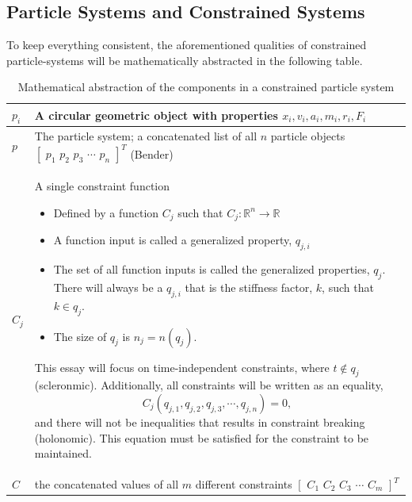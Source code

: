 \documentclass[12pt, letterpaper]{article}
\begin{document}
\subsection{Particle Systems and Constrained Systems}
\hspace{\parindent} To keep everything consistent, the aforementioned qualities of constrained particle-systems will be mathematically abstracted in the following table.
\def\arraystretch{2}%
\begin{table}[H]
\begin{tabular}{ | m{3em} | m{13.5cm}| }
  \hline
  $p_i$ & A circular geometric object with properties $x_{i}, v_{i}, a_{i}, m_{i}, r_{i}, F_{i}$ \\ 
  \hline
  $p$ & The particle system; a concatenated list of all $n$ particle objects $[\hspace{4pt}p_{1} \hspace{4pt} p_{2} \hspace{4pt} p_{3} \hspace{4pt} \cdots \hspace{4pt} p_{n}\hspace{4pt}] ^ {T}$ (Bender) \\ 
  \hline
  $C_j$ & A single constraint function
 \begin{itemize}
  \item Defined by a function $C_j$ such that $C_{j}: \mathbb{R}^{n}\rightarrow \mathbb{R}$
  \item A function input is called a generalized property, $q_{j,i}$
  \item The set of all function inputs is called the generalized properties, $q_j$. There will always be a $q_{j,i}$ that is the stiffness factor, $k$, such that $k \in q_j$.
  \item The size of $q_j$ is $n_{j} = n(q_{j})$.
\end{itemize}
This essay will focus on time-independent constraints, where $t \notin q_{j}$ (scleronmic). Additionally, all constraints will be written as an equality, $$C_{j}(q_{j,1},q_{j,2},q_{j,3},\cdots,q_{j,n}) = 0,$$ and there will not be inequalities that results in constraint breaking (holonomic). This equation must be satisfied for the constraint to be maintained.
\\
\hline
 $C$ & the concatenated values of all $m$ different constraints $[\hspace{4pt}C_{1} \hspace{4pt} C_{2} \hspace{4pt} C_{3} \hspace{4pt} \cdots \hspace{4pt} C_{m}\hspace{4pt}] ^ {T}$\\
 \hline
\end{tabular}
\centering
\caption{Mathematical abstraction of the components in a constrained particle system}
\label{table:table}
\end{table}
\end{document}
